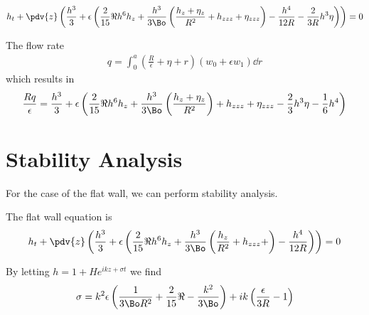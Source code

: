 \documentclass[12pt]{article}
\begin{document}
\begin{align}
h_t + \pdv{z}\left(\frac{h^3}{3} +\epsilon\left(\frac{2}{15}\Re h^6 h_z + \frac{h^3}{3\Bo}\left(\frac{h_z+ \eta_z}{R^2} + h_{zzz}+ \eta_{zzz}\right)- \frac{h^4}{12R}- \frac{2}{3R}h^3\eta\right)\right)=0
\end{align}

The flow rate 
\begin{align}
q = \int_{0}^{a}{\left(\frac{R}{\epsilon}+\eta+r\right)(w_0 + \epsilon w_1)\dd{r}}
\end{align}
which results in 
\begin{align}
\frac{Rq}{\epsilon} = \frac{h^3}{3}+\epsilon\left(\frac{2}{15}\Re h^6h_z + \frac{h^3}{3\Bo}\left(\frac{h_z+\eta_z}{R^2}\right)+h_{zzz} + \eta_{zzz}- \frac{2}{3}h^3\eta-\frac{1}{6}h^4\right)
\end{align}


\section{Stability Analysis}

For the case of  the flat wall, we can perform stability analysis.

The flat wall equation is 
\begin{align}
h_t + \pdv{z}\left(\frac{h^3}{3} +\epsilon\left(\frac{2}{15}\Re h^6 h_z + \frac{h^3}{3\Bo}\left(\frac{h_z}{R^2} + h_{zzz}+ \right)- \frac{h^4}{12R}\right)\right)=0
\end{align}

By letting $h = 1 + He^{ikz + \sigma t}$ we find 
\begin{align}
\sigma = k^2\epsilon\left(\frac{1}{3\Bo R^2}+\frac{2}{15}\Re  - \frac{k^2}{3\Bo}\right)+ik\left(\frac{\epsilon}{3R}-1\right)
\end{align}




\end{document}
